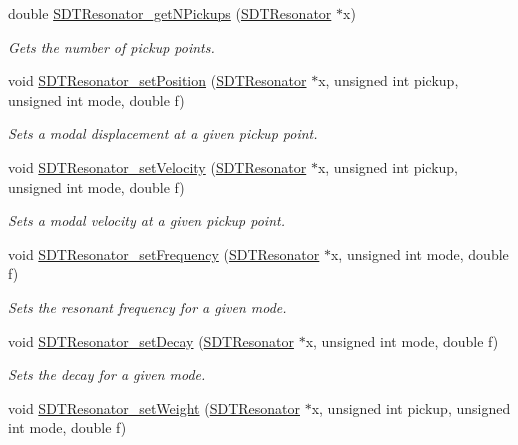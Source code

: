 \begin{DoxyCompactItemize}
double \hyperlink{group__resonators_ga15e4a46f0159847ab398fbd07724765d}{S\+D\+T\+Resonator\+\_\+get\+N\+Pickups} (\hyperlink{group__resonators_ga07d183de45e9713277c8f62d93d9be9c}{S\+D\+T\+Resonator} $\ast$x)
\begin{DoxyCompactList}\small\item\em Gets the number of pickup points. \end{DoxyCompactList}\item 
void \hyperlink{group__resonators_ga93dd7a7078a59411056c981f83bf608d}{S\+D\+T\+Resonator\+\_\+set\+Position} (\hyperlink{group__resonators_ga07d183de45e9713277c8f62d93d9be9c}{S\+D\+T\+Resonator} $\ast$x, unsigned int pickup, unsigned int mode, double f)
\begin{DoxyCompactList}\small\item\em Sets a modal displacement at a given pickup point. \end{DoxyCompactList}\item 
void \hyperlink{group__resonators_ga899d173cc4f8c5d35537fa0de2dc7c8e}{S\+D\+T\+Resonator\+\_\+set\+Velocity} (\hyperlink{group__resonators_ga07d183de45e9713277c8f62d93d9be9c}{S\+D\+T\+Resonator} $\ast$x, unsigned int pickup, unsigned int mode, double f)
\begin{DoxyCompactList}\small\item\em Sets a modal velocity at a given pickup point. \end{DoxyCompactList}\item 
void \hyperlink{group__resonators_gaf185ee761f1b70d09c6e276cabb2ddcd}{S\+D\+T\+Resonator\+\_\+set\+Frequency} (\hyperlink{group__resonators_ga07d183de45e9713277c8f62d93d9be9c}{S\+D\+T\+Resonator} $\ast$x, unsigned int mode, double f)
\begin{DoxyCompactList}\small\item\em Sets the resonant frequency for a given mode. \end{DoxyCompactList}\item 
void \hyperlink{group__resonators_gac293efb03ca211634197a7887c69a022}{S\+D\+T\+Resonator\+\_\+set\+Decay} (\hyperlink{group__resonators_ga07d183de45e9713277c8f62d93d9be9c}{S\+D\+T\+Resonator} $\ast$x, unsigned int mode, double f)
\begin{DoxyCompactList}\small\item\em Sets the decay for a given mode. \end{DoxyCompactList}\item 
void \hyperlink{group__resonators_ga9213fe8d7e2c3bb97aadb8755dd8d067}{S\+D\+T\+Resonator\+\_\+set\+Weight} (\hyperlink{group__resonators_ga07d183de45e9713277c8f62d93d9be9c}{S\+D\+T\+Resonator} $\ast$x, unsigned int pickup, unsigned int mode, double f)

\end{DoxyCompactItemize}
